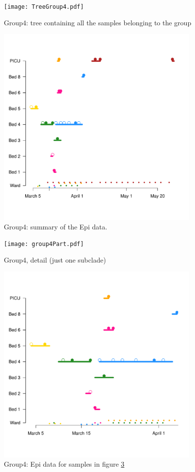 \documentclass[12pt,a4paper]{article}
\begin{document}
\begin{figure}[!ht]
  \centering
     \texttt{[image: TreeGroup4.pdf]}
  \caption{Group4: tree containing all the samples belonging to the group}\label{Group4Tree}
\end{figure}

\begin{figure}[!ht]
  \centering
       \includegraphics[width=0.9\textwidth]{Group4_Bed.pdf}
  \caption{Group4: summary of the Epi data.}\label{Group4Bed}
\end{figure}


\begin{figure}[!ht]
  \centering
     \texttt{[image: group4Part.pdf]}
  \caption{Group4, detail (just one subclade)}\label{Group4TreePart}
\end{figure}

\begin{figure}[!ht]
  \centering
     \includegraphics[width=0.9\textwidth]{Group4_beds_part.pdf}
  \caption{Group4: Epi data for samples in figure \ref{Group4TreePart} }\label{Group4BedPart}
\end{figure}
\end{document}
